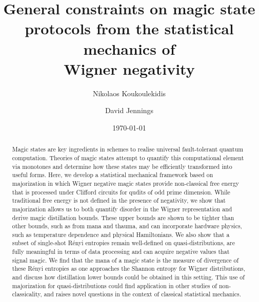 \documentclass[pra,
aps,
twocolumn,
superscriptaddress,
groupedaddress,
nofootinbib,
reprint
]{revtex4-1}
\begin{document}
\begin{abstract}
Magic states are key ingredients in schemes to realise universal fault-tolerant quantum computation.
Theories of magic states attempt to quantify this computational element via monotones and determine how these states may be efficiently transformed into useful forms. Here, we develop a statistical mechanical framework based on majorization in which Wigner negative magic states provide non-classical free energy that is processed under Clifford circuits for qudits of odd prime dimension. While traditional free energy is not defined in the presence of negativity, we show that majorization allows us to both quantify disorder in the Wigner representation and derive magic distillation bounds. These upper bounds are shown to be tighter than other bounds, such as from mana and thauma, and can incorporate hardware physics, such as temperature dependence and physical Hamiltonians. We also show that a subset of single-shot R\'{e}nyi entropies remain well-defined on quasi-distributions, are fully meaningful in terms of data processing and can acquire negative values that signal magic. We find that the mana of a magic state is the measure of divergence of these R\'{e}nyi entropies as one approaches the Shannon entropy for Wigner distributions, and discuss how distillation lower bounds could be obtained in this setting. This use of majorization for quasi-distributions could find application in other studies of non-classicality, and raises novel questions in the context of classical statistical mechanics.
\end{abstract}


\title{General constraints on magic state protocols from the statistical mechanics of \\Wigner negativity}

\author{Nikolaos Koukoulekidis}
\author{David Jennings}

\date{\today}
\maketitle

\end{document}
